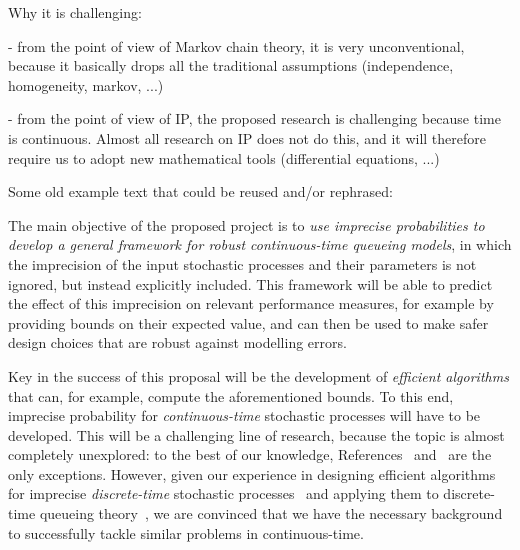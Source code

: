 \documentclass[11pt,dvipsnames,usenames,a4paper]{article}
\begin{document}
Why it is challenging:

- from the point of view of Markov chain theory, it is very unconventional, because it basically drops all the traditional assumptions (independence, homogeneity, markov, ...)

- from the point of view of IP, the proposed research is challenging because time is continuous. Almost all research on IP does not do this, and it will therefore require us to adopt new mathematical tools (differential equations, ...)



{\color{Gray}
Some old example text that could be reused and/or rephrased:

The main objective of the proposed project is to \emph{use imprecise probabilities to develop a general framework for robust continuous-time queueing models}, in which the  imprecision of the input stochastic processes and their parameters is not ignored, but instead explicitly included. This framework will be able to predict the effect of this imprecision on relevant performance measures, for example by providing bounds on their expected value, and can then be used to make safer design choices that are robust against modelling errors.


Key in the success of this proposal will be the development of \emph{efficient algorithms} that can, for example, compute the aforementioned bounds. To this end, imprecise probability for \emph{continuous-time} stochastic processes will have to be developed. This will be a challenging line of research, because the topic is almost completely unexplored: to the best of our knowledge, References~\cite{Troffaes+GSB-ISIPTA15p} and~\cite{Skulj2015} are the only exceptions. However, given our experience in designing efficient algorithms for imprecise \emph{discrete-time} stochastic processes~\cite{cooman2008} and applying them to discrete-time queueing theory~\cite{2015Lopatatzidis}, we are convinced that we have the necessary background to successfully tackle similar problems in continuous-time.

}
\end{document}
